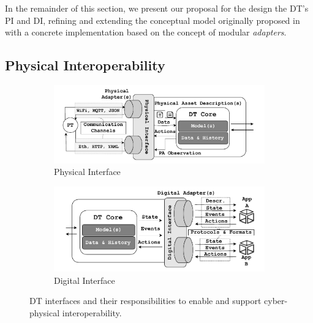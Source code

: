 In the remainder of this section, we present our proposal for the design the \ac{DT}'s \ac{PI} and \ac{DI}, refining and extending the conceptual model originally proposed in \cite{web-of-dt-ricci-2022} with a concrete implementation based on the concept of modular \emph{adapters}.

\subsection{Physical Interoperability}
\label{sec:physical_interoperability}



  \begin{figure}[h!]
    \setlength{\belowcaptionskip}{-5pt}
    \centering
    \begin{subfigure}{0.5}
        \centering
        \includegraphics[width=\linewidth]{figures/dt-interoperability/dt_interoperability_physical.pdf}
        \caption{Physical Interface}
        \label{fig:physical_interoperability}
    \end{subfigure}
    \begin{subfigure}{0.5}
        \centering
        \includegraphics[width=\linewidth]{figures/dt-interoperability/dt_interoperability_digital.pdf}
        \caption{Digital Interface}
        \label{fig:digital_interoperability}
    \end{subfigure}
    
    \caption{DT interfaces and their responsibilities to enable and support cyber-physical interoperability.}
    \label{fig:benchmark_webapp}
  \end{figure}


